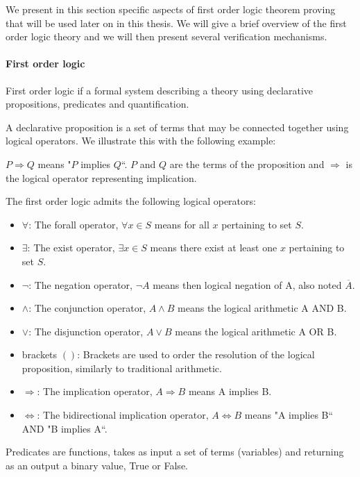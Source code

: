 \label{sec:proving-theory}
We present in this section specific aspects of first order logic theorem proving that will be used later on in this thesis. We will give a brief overview of the first order logic theory and we will then present several verification mechanisms.

\paragraph{First order logic}
First order logic if a formal system describing a theory using declarative propositions, predicates and quantification.

A declarative proposition is a set of terms  that may be connected together using logical operators.
We illustrate this with the following example:

$P \Rightarrow Q$ means "$P$ implies $Q$``. $P$ and $Q$ are the terms of the proposition and $\Rightarrow$ is the logical operator representing implication.

The first order logic admits the following logical operators:

\begin{itemize}
    \item $\forall$: The forall operator, $\forall x\in S$ means for all $x$ pertaining to set $S$.
    \item $\exists$: The exist operator, $\exists x\in S$ means there exist at least one $x$ pertaining to set $S$.
    \item $\neg$: The negation operator, $\neg A$ means then logical negation of A, also noted $\overline{A}$.
    \item $\wedge$: The conjunction operator, $A \wedge B$ means the logical arithmetic A AND B.
    \item $\vee$: The disjunction operator, $A \vee B$ means the logical arithmetic A OR B.
    \item brackets $( )$: Brackets are used to order the resolution of the logical proposition, similarly to traditional arithmetic.
    \item $\Rightarrow$: The implication operator, $A \Rightarrow B$ means A implies B.
    \item $\Leftrightarrow$: The bidirectional implication operator, $A \Leftrightarrow B$ means "A implies B`` AND "B implies A``.
\end{itemize}

Predicates are functions, takes as input a set of terms (variables) and returning as an output a binary value, True or False.

